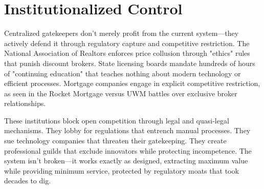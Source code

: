 \section{Institutionalized Control}

Centralized gatekeepers don't merely profit from the current system—they actively defend it through regulatory capture and competitive restriction. The National Association of Realtors enforces price collusion through "ethics" rules that punish discount brokers. State licensing boards mandate hundreds of hours of "continuing education" that teaches nothing about modern technology or efficient processes. Mortgage companies engage in explicit competitive restriction, as seen in the Rocket Mortgage versus UWM battles over exclusive broker relationships.

These institutions block open competition through legal and quasi-legal mechanisms. They lobby for regulations that entrench manual processes. They sue technology companies that threaten their gatekeeping. They create professional guilds that exclude innovators while protecting incompetence. The system isn't broken—it works exactly as designed, extracting maximum value while providing minimum service, protected by regulatory moats that took decades to dig.

